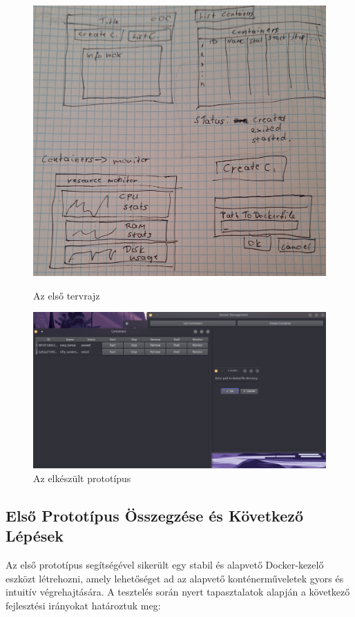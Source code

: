 \begin{figure}[H]
	\centering
	\begin{minipage}{0.45\textwidth}
		\centering
		\includegraphics[width=1\linewidth]{images/first_design-draw}
		\caption{Az első tervrajz}
		\label{fig:firstdesign-draw}
	\end{minipage}
	\hfill
	\begin{minipage}{0.45\textwidth}
		\centering
		\includegraphics[width=1\linewidth]{images/0.0}
		\caption{Az elkészült prototípus}
		\label{fig:0}
	\end{minipage}
\end{figure}



\subsection{Első Prototípus Összegzése és Következő Lépések}
Az első prototípus segítségével sikerült egy stabil és alapvető Docker-kezelő eszközt létrehozni, amely lehetőséget ad az alapvető konténerműveletek gyors és intuitív végrehajtására. A tesztelés során nyert tapasztalatok alapján a következő fejlesztési irányokat határoztuk meg:


